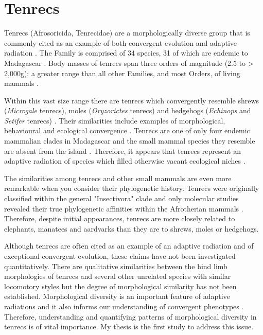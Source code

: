 \section{Tenrecs}
	Tenrecs (Afrosoricida, Tenrecidae) are a morphologically diverse group that is commonly cited as an example of both convergent evolution and adaptive radiation \citep{Soarimalala2011, Eisenberg1969}. %
	The Family is comprised of 34 species, 31 of which are endemic to Madagascar \citep{Olson2013}. Body masses of tenrecs span three orders of magnitude (2.5 to > 2,000g); a greater range than all other Families, and most Orders, of living mammals \citep{Olson2003}.
	
	Within this vast size range there are tenrecs which convergently resemble shrews (\textit{Microgale} tenrecs), moles (\textit{Oryzorictes} tenrecs) and hedgehogs (\textit{Echinops} and \textit{Setifer} tenrecs) \citep{Eisenberg1969}. Their similarities include examples of morphological, behavioural and ecological convergence \citep{Soarimalala2011}. Tenrecs are one of only four endemic mammalian clades in Madagascar and the small mammal species they resemble are absent from the island \citep{Garbutt1999}. Therefore, it appears that tenrecs represent an adaptive radiation of species which filled otherwise vacant ecological niches \citep{Soarimalala2011}.

	The similarities among tenrecs and other small mammals are even more remarkable when you consider their phylogenetic history. Tenrecs were originally classified within the general "Insectivora" clade and only molecular studies revealed their true phylogenetic affinities within the Afrotherian mammals \citep{Stanhope1998}. Therefore, despite initial appearances, tenrecs are more closely related to elephants, manatees and aardvarks than they are to shrews, moles or hedgehogs. 

	Although tenrecs are often cited as an example of an adaptive radiation and of exceptional convergent evolution, these claims have not been investigated quantitatively. There are qualitative similarities between the hind limb morphologies of tenrecs and several other unrelated species with similar locomotory styles \citep{Salton2009} but the degree of morphological similarity has not been established. Morphological diversity is an important feature of adaptive radiations \citep{Losos2010a} and it also informs our understanding of convergent phenotypes \citep{Muschick2012}. Therefore, understanding and quantifying patterns of morphological diversity in tenrecs is of vital importance.
	 My thesis is the first study to address this issue. 

